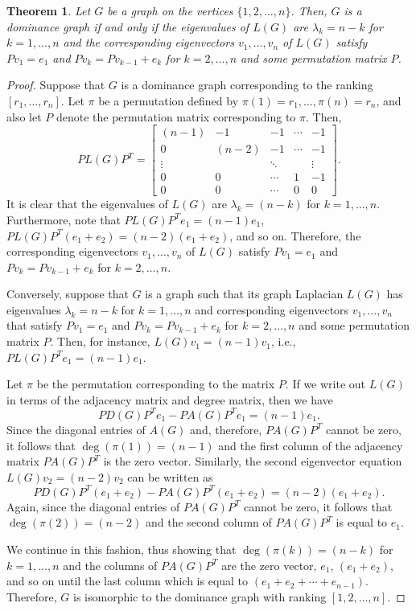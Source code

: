 \documentclass{article}
\newtheorem{theorem}{Theorem}[section]
\begin{document}
\begin{theorem}\label{thm:spec-char}
Let $G$ be a graph on the vertices $\{1,2,\ldots,n\}$.
Then, $G$ is a dominance graph if and only if the eigenvalues of $L(G)$ are $\lambda_{k}=n-k$ for $k=1,\ldots,n$ and the corresponding eigenvectors $v_{1},\ldots,v_{n}$ of $L(G)$ satisfy $Pv_{1}=e_{1}$ and $Pv_{k}=Pv_{k-1}+e_{k}$ for $k=2,\ldots,n$ and some permutation matrix $P$. 
\end{theorem}
\begin{proof}
Suppose that $G$ is a dominance graph corresponding to the ranking $[r_{1},\ldots,r_{n}]$.
Let $\pi$ be a permutation defined by $\pi(1)=r_{1},\ldots,\pi(n)=r_{n}$, and also let $P$ denote the permutation matrix corresponding to $\pi$. 
Then,
\[
PL(G)P^{T}=
\begin{bmatrix}
(n-1) & -1 & -1 & \cdots & -1 \\
0 & (n-2) & -1 & \cdots & -1 \\
\vdots & & \ddots & & \vdots \\
0 & 0 & \cdots & 1 & -1 \\
0 & 0 & \cdots & 0 & 0
\end{bmatrix}.
\]
It is clear that the eigenvalues of $L(G)$ are $\lambda_{k}=(n-k)$ for $k=1,\ldots,n$.
Furthermore, note that $PL(G)P^{T}e_{1}=(n-1)e_{1}$, $PL(G)P^{T}(e_{1}+e_{2})=(n-2)(e_{1}+e_{2})$, and so on.
Therefore, the corresponding eigenvectors $v_{1},\ldots,v_{n}$ of $L(G)$ satisfy $Pv_{1}=e_{1}$ and $Pv_{k}=Pv_{k-1}+e_{k}$ for $k=2,\ldots,n$.

Conversely, suppose that $G$ is a graph such that its graph Laplacian $L(G)$ has eigenvalues $\lambda_{k}=n-k$ for $k=1,\ldots,n$ and corresponding eigenvectors $v_{1},\ldots,v_{n}$ that satisfy $Pv_{1}=e_{1}$ and $Pv_{k}=Pv_{k-1}+e_{k}$ for $k=2,\ldots,n$ and some permutation matrix $P$.
Then, for instance, $L(G)v_{1}=(n-1)v_{1}$, i.e., $PL(G)P^{T}e_{1}=(n-1)e_{1}$.

Let $\pi$ be the permutation corresponding to the matrix $P$.
If we write out $L(G)$ in terms of the adjacency matrix and degree matrix, then we have
\[
PD(G)P^{T}e_{1}-PA(G)P^{T}e_{1}=(n-1)e_{1}.
\]
Since the diagonal entries of $A(G)$ and, therefore, $PA(G)P^{T}$ cannot be zero, it follows that $\deg(\pi(1))=(n-1)$ and the first column of the adjacency matrix $PA(G)P^{T}$ is the zero vector.
Similarly, the second eigenvector equation $L(G)v_{2}=(n-2)v_{2}$ can be written as
\[
PD(G)P^{T}(e_{1}+e_{2})-PA(G)P^{T}(e_{1}+e_{2})=(n-2)(e_{1}+e_{2}).
\]
Again, since the diagonal entries of $PA(G)P^{T}$ cannot be zero, it follows that $\deg(\pi(2))=(n-2)$ and the second column of $PA(G)P^{T}$ is equal to $e_{1}$.

We continue in this fashion, thus showing that $\deg(\pi(k))=(n-k)$ for $k=1,\ldots,n$ and the columns of $PA(G)P^{T}$ are the zero vector, $e_{1}$, $(e_{1}+e_{2})$, and so on until the last column which is equal to $(e_{1}+e_{2}+\cdots+e_{n-1})$.
Therefore, $G$ is isomorphic to the dominance graph with ranking $[1,2,\ldots,n]$. 
\end{proof}
\end{document}
